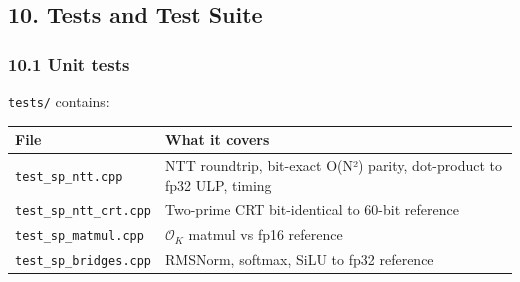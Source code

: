 \documentclass[
  11pt,
]{article}
\begin{document}
\hypertarget{tests-and-test-suite}{%
\subsection{10. Tests and Test Suite}\label{tests-and-test-suite}}

\hypertarget{unit-tests}{%
\subsubsection{10.1 Unit tests}\label{unit-tests}}

\texttt{tests/} contains:

\begin{longtable}[]{@{}ll@{}}
\toprule
\begin{minipage}[b]{0.26\columnwidth}\raggedright
File\strut
\end{minipage} & \begin{minipage}[b]{0.68\columnwidth}\raggedright
What it covers\strut
\end{minipage}\tabularnewline
\midrule
\endhead
\begin{minipage}[t]{0.26\columnwidth}\raggedright
\texttt{test\_sp\_ntt.cpp}\strut
\end{minipage} & \begin{minipage}[t]{0.68\columnwidth}\raggedright
NTT roundtrip, bit-exact O(N²) parity, dot-product to fp32 ULP,
timing\strut
\end{minipage}\tabularnewline
\begin{minipage}[t]{0.26\columnwidth}\raggedright
\texttt{test\_sp\_ntt\_crt.cpp}\strut
\end{minipage} & \begin{minipage}[t]{0.68\columnwidth}\raggedright
Two-prime CRT bit-identical to 60-bit reference\strut
\end{minipage}\tabularnewline
\begin{minipage}[t]{0.26\columnwidth}\raggedright
\texttt{test\_sp\_matmul.cpp}\strut
\end{minipage} & \begin{minipage}[t]{0.68\columnwidth}\raggedright
\(\mathcal{O}_K\) matmul vs fp16 reference\strut
\end{minipage}\tabularnewline
\begin{minipage}[t]{0.26\columnwidth}\raggedright
\texttt{test\_sp\_bridges.cpp}\strut
\end{minipage} & \begin{minipage}[t]{0.68\columnwidth}\raggedright
RMSNorm, softmax, SiLU to fp32 reference\strut

\end{minipage}
\end{longtable}
\end{document}
